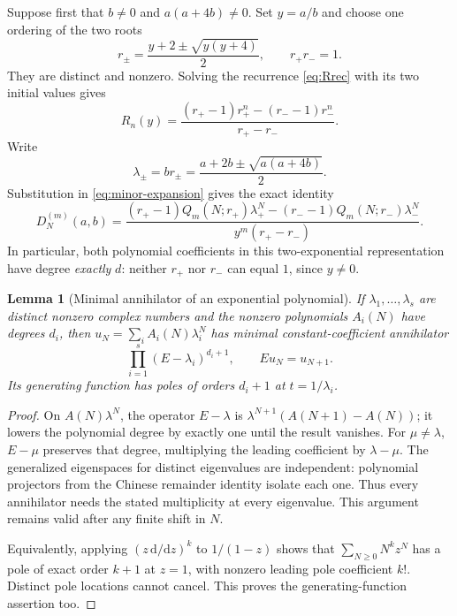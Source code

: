 \documentclass[11pt,a4paper]{article}
\numberwithin{equation}{section}
\newtheorem{lemma}[theorem]{Lemma}
\theoremstyle{definition}
\theoremstyle{remark}
\newcommand{\D}[2]{D_{#1}^{(#2)}}
\newcommand{\dd}{\mathrm d}
\begin{document}
Suppose first that $b\ne0$ and $a(a+4b)\ne0$.  Set $y=a/b$ and choose
one ordering of the two roots
\begin{equation}\label{eq:rroots}
 r_\pm=\frac{y+2\pm\sqrt{y(y+4)}}2,
 \qquad r_+r_-=1.
\end{equation}
They are distinct and nonzero.  Solving the recurrence
\eqref{eq:Rrec} with its two initial values gives
\begin{equation}\label{eq:Rclosed}
 R_n(y)=\frac{(r_+-1)r_+^n-(r_--1)r_-^n}{r_+-r_-}.
\end{equation}
Write
\begin{equation}\label{eq:lambda}
 \lambda_\pm=br_\pm
    =\frac{a+2b\pm\sqrt{a(a+4b)}}2.
\end{equation}
Substitution in \eqref{eq:minor-expansion} gives the exact identity
\begin{equation}\label{eq:exactbranches}
 \D{N}{m}(a,b)=
 \frac{(r_+-1)Q_m(N;r_+)\lambda_+^N
       -(r_--1)Q_m(N;r_-)\lambda_-^N}
      {y^m(r_+-r_-)}.
\end{equation}
In particular, both polynomial coefficients in this two-exponential
representation have degree \emph{exactly} $d$: neither $r_+$ nor $r_-$
can equal $1$, since $y\ne0$.

\begin{lemma}[Minimal annihilator of an exponential polynomial]
\label{lem:minimal}
If $\lambda_1,\ldots,\lambda_s$ are distinct nonzero complex numbers
and the nonzero polynomials $A_i(N)$ have degrees $d_i$, then
$u_N=\sum_i A_i(N)\lambda_i^N$ has minimal constant-coefficient
annihilator
\begin{equation}\label{eq:generalminimal}
 \prod_{i=1}^s(E-\lambda_i)^{d_i+1},\qquad Eu_N=u_{N+1}.
\end{equation}
Its generating function has poles of orders $d_i+1$ at
$t=1/\lambda_i$.
\end{lemma}
\begin{proof}
On $A(N)\lambda^N$, the operator $E-\lambda$ is
$\lambda^{N+1}(A(N+1)-A(N))$; it lowers the polynomial degree by
exactly one until the result vanishes.  For $\mu\ne\lambda$,
$E-\mu$ preserves that degree, multiplying the leading coefficient
by $\lambda-\mu$.  The generalized eigenspaces for distinct eigenvalues
are independent: polynomial projectors from the Chinese remainder
identity isolate each one.  Thus every annihilator needs the stated
multiplicity at every eigenvalue.  This argument remains valid after
any finite shift in $N$.

Equivalently, applying $(z\,\dd/\dd z)^k$ to $1/(1-z)$ shows that
$\sum_{N\geq0}N^k z^N$ has a pole of exact order $k+1$ at $z=1$,
with nonzero leading pole coefficient $k!$.  Distinct pole locations
cannot cancel.  This proves the generating-function assertion too.
\end{proof}
\end{document}

